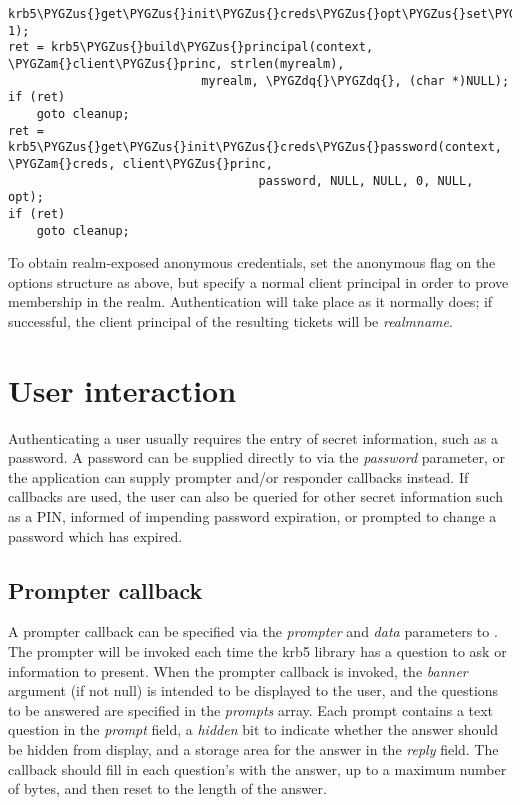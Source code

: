 \documentclass[letterpaper,10pt,english]{sphinxmanual}
\def\PYGZus{\char`\_}
\def\PYGZam{\char`\&}
\def\PYGZdq{\char`\"}
\begin{document}
\begin{Verbatim}[commandchars=\\\{\}]
krb5\PYGZus{}get\PYGZus{}init\PYGZus{}creds\PYGZus{}opt\PYGZus{}set\PYGZus{}anonymous(opt, 1);
ret = krb5\PYGZus{}build\PYGZus{}principal(context, \PYGZam{}client\PYGZus{}princ, strlen(myrealm),
                           myrealm, \PYGZdq{}\PYGZdq{}, (char *)NULL);
if (ret)
    goto cleanup;
ret = krb5\PYGZus{}get\PYGZus{}init\PYGZus{}creds\PYGZus{}password(context, \PYGZam{}creds, client\PYGZus{}princ,
                                   password, NULL, NULL, 0, NULL, opt);
if (ret)
    goto cleanup;
\end{Verbatim}

To obtain realm-exposed anonymous credentials, set the anonymous flag
on the options structure as above, but specify a normal client
principal in order to prove membership in the realm.  Authentication
will take place as it normally does; if successful, the client
principal of the resulting tickets will be \emph{realmname}.


\section{User interaction}
\label{appdev/init_creds:user-interaction}
Authenticating a user usually requires the entry of secret
information, such as a password.  A password can be supplied directly
to {\hyperref[appdev/refs/api/krb5_get_init_creds_password:c.krb5_get_init_creds_password]{}} via the \emph{password}
parameter, or the application can supply prompter and/or responder
callbacks instead.  If callbacks are used, the user can also be
queried for other secret information such as a PIN, informed of
impending password expiration, or prompted to change a password which
has expired.


\subsection{Prompter callback}
\label{appdev/init_creds:prompter-callback}
A prompter callback can be specified via the \emph{prompter} and \emph{data}
parameters to {\hyperref[appdev/refs/api/krb5_get_init_creds_password:c.krb5_get_init_creds_password]{}}.  The prompter
will be invoked each time the krb5 library has a question to ask or
information to present.  When the prompter callback is invoked, the
\emph{banner} argument (if not null) is intended to be displayed to the
user, and the questions to be answered are specified in the \emph{prompts}
array.  Each prompt contains a text question in the \emph{prompt} field, a
\emph{hidden} bit to indicate whether the answer should be hidden from
display, and a storage area for the answer in the \emph{reply} field.  The
callback should fill in each question's  with the
answer, up to a maximum number of  bytes, and then
reset  to the length of the answer.
\end{document}
